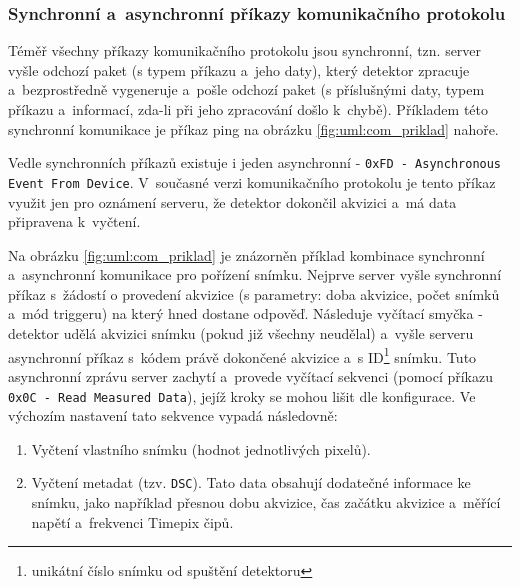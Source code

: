 \subsubsection{Synchronní a~asynchronní příkazy komunikačního protokolu}\label{atlas:com:synchonni_a_asynchonni_prikazy}
Téměř všechny příkazy komunikačního protokolu jsou synchronní, tzn. server vyšle odchozí paket (s typem příkazu a~jeho daty), který detektor zpracuje a~bezprostředně vygeneruje a~pošle odchozí paket (s příslušnými daty, typem příkazu a~informací, zda-li při jeho zpracování došlo k~chybě). Příkladem této synchronní komunikace je příkaz ping na obrázku \ref{fig:uml:com_priklad} nahoře.

Vedle synchronních příkazů existuje i jeden asynchronní - \texttt{0xFD - Asynchronous Event From Device}. V~současné verzi komunikačního protokolu je tento příkaz využit jen pro oznámení serveru, že detektor dokončil akvizici a~má data připravena k~vyčtení.

Na obrázku \ref{fig:uml:com_priklad} je znázorněn příklad kombinace synchronní a~asynchronní komunikace pro pořízení snímku. Nejprve server vyšle synchronní příkaz s~žádostí o provedení akvizice (s parametry: doba akvizice, počet snímků a~mód triggeru) na který hned dostane odpověď. Následuje vyčítací smyčka - detektor udělá akvizici snímku (pokud již všechny neudělal) a~vyšle serveru asynchronní příkaz s~kódem právě dokončené akvizice a~s ID\footnote{unikátní číslo snímku od spuštění detektoru} snímku. Tuto asynchronní zprávu server zachytí a~provede vyčítací sekvenci (pomocí příkazu \texttt{0x0C - Read Measured Data}), jejíž kroky se mohou lišit dle konfigurace. Ve výchozím nastavení tato sekvence vypadá následovně:
\begin{enumerate}
	\item Vyčtení vlastního snímku (hodnot jednotlivých pixelů).
	\item Vyčtení metadat (tzv. \texttt{DSC}). Tato data obsahují dodatečné informace ke snímku, jako například přesnou dobu akvizice, čas začátku akvizice a~měřící napětí a~frekvenci Timepix čipů.
\end{enumerate}

